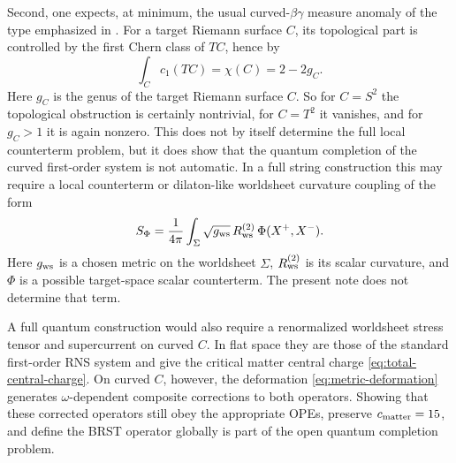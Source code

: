 \documentclass[11pt]{article}
\begin{document}
Second, one expects, at minimum, the usual curved-$\beta\gamma$ measure anomaly of the type emphasized in \cite{nekrasov2005curvedbetagammasystems}. For a target Riemann surface $C$, its topological part is controlled by the first Chern class of $TC$, hence by
\begin{equation}\label{eq:target-euler}
\int_C c_1(TC)=\chi(C)=2-2g_C.
\end{equation}
Here $g_C$ is the genus of the target Riemann surface $C$. So for $C=S^2$ the topological obstruction is certainly nontrivial, for $C=T^2$ it vanishes, and for $g_C>1$ it is again nonzero. This does not by itself determine the full local counterterm problem, but it does show that the quantum completion of the curved first-order system is not automatic. In a full string construction this may require a local counterterm or dilaton-like worldsheet curvature coupling of the form
\begin{equation}\label{eq:dilaton-like-coupling}
S_\Phi=\frac{1}{4\pi}\int_\Sigma \sqrt{g_{\rm ws}}\,R^{(2)}_{\rm ws}\,\Phi(X^+,X^-).
\end{equation}
Here $g_{\rm ws}$ is a chosen metric on the worldsheet $\Sigma$, $R^{(2)}_{\rm ws}$ is its scalar curvature, and $\Phi$ is a possible target-space scalar counterterm. The present note does not determine that term.

A full quantum construction would also require a renormalized worldsheet stress tensor and supercurrent on curved $C$. In flat space they are those of the standard first-order RNS system and give the critical matter central charge \eqref{eq:total-central-charge}. On curved $C$, however, the deformation \eqref{eq:metric-deformation} generates $\omega$-dependent composite corrections to both operators. Showing that these corrected operators still obey the appropriate OPEs, preserve $c_{\rm matter}=15$, and define the BRST operator globally is part of the open quantum completion problem.
\end{document}
